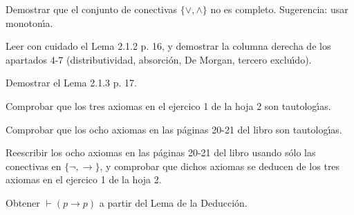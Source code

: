 \begin{problem}[3]
Demostrar que el  conjunto de conectivas $\{\vee, \wedge\}$ no es completo.
Sugerencia: usar monoton\'{\i}a.
\solution

\end{problem}



\begin{problem}[4]
Leer con cuidado el Lema 2.1.2 p. 16, y demostrar la columna derecha de los apartados
4-7 (distributividad, absorci\'on, De Morgan, tercero exclu\'{\i}do).
\solution

\end{problem}



\begin{problem}[5]
Demostrar el Lema 2.1.3 p. 17.
\solution

\end{problem}



\begin{problem}[6]
Comprobar que los tres axiomas en el ejercico 1 de la hoja 2 son tautolog\'{\i}as.
\solution

\end{problem}



\begin{problem}[7]
Comprobar que los ocho axiomas en las p\'aginas 20-21 del libro son tautolog\'{\i}as.
\solution

\end{problem}



\begin{problem}[8]
Reescribir  los ocho axiomas en las p\'aginas 20-21 del libro
usando s\'olo las conectivas en $\{\neg, \to\}$,  y  comprobar que dichos axiomas
se deducen de los   tres axiomas en el ejercico 1 de la hoja 2.
\solution

\end{problem}

\begin{problem}[9]
Obtener $\vdash (p\to p)$ a partir del Lema de la Deducci\'on.
\solution

\end{problem}

